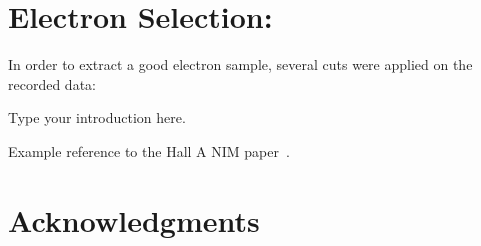 \documentclass[preprint,12pt]{elsarticle}
\begin{document}
\begin{enumerate}
{}
\end{enumerate}
\section{Electron Selection:}
  In order to extract a good electron sample, several cuts were applied on the recorded data:
 


Type your introduction here.

Example reference to the Hall A NIM paper~\cite{Alcorn:2004sb}.

\appendix
\section{Acknowledgments}

 

\end{document}
